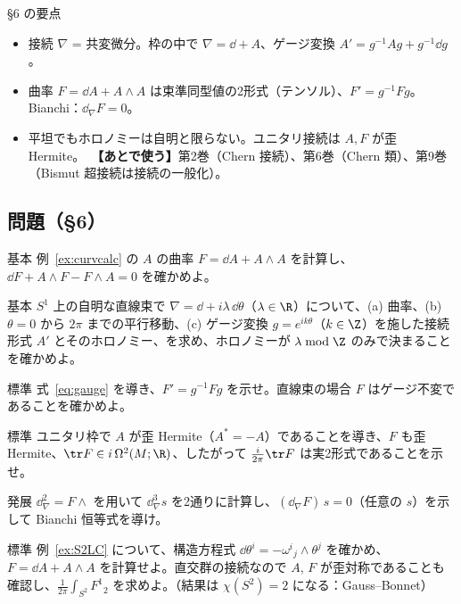 \begin{keybox}{§6 の要点}
\begin{itemize}
\item 接続 $\nabla$ = 共変微分。枠の中で $\nabla=\dd+A$、ゲージ変換 $A'=g^{-1}Ag+g^{-1}\dd g$。
\item 曲率 $F=\dd A+A\wedge A$ は束準同型値の2形式（テンソル）、$F'=g^{-1}Fg$。Bianchi：$\dd_\nabla F=0$。
\item 平坦でもホロノミーは自明と限らない。ユニタリ接続は $A,F$ が歪 Hermite。\ \textbf{【あとで使う】}第2巻（Chern 接続）、第6巻（Chern 類）、第9巻（Bismut 超接続は接続の一般化）。
\end{itemize}
\end{keybox}

\subsection*{問題（§6）}
\begin{prob}{基本}\label{p:curvcalc}
例~\ref{ex:curvcalc} の $A$ の曲率 $F=\dd A+A\wedge A$ を計算し、$\dd F+A\wedge F-F\wedge A=0$ を確かめよ。
\end{prob}
\begin{prob}{基本}\label{p:holonomy}
$S^1$ 上の自明な直線束で $\nabla=\dd+i\lambda\,\dd\theta$（$\lambda\in\R$）について、(a) 曲率、(b) $\theta=0$ から $2\pi$ までの平行移動、(c) ゲージ変換 $g=e^{ik\theta}$（$k\in\Z$）を施した接続形式 $A'$ とそのホロノミー、を求め、ホロノミーが $\lambda\bmod\Z$ のみで決まることを確かめよ。
\end{prob}
\begin{prob}{標準}\label{p:gauge}
式~\eqref{eq:gauge} を導き、$F'=g^{-1}Fg$ を示せ。直線束の場合 $F$ はゲージ不変であることを確かめよ。
\end{prob}
\begin{prob}{標準}\label{p:unitary}
ユニタリ枠で $A$ が歪 Hermite（$A^*=-A$）であることを導き、$F$ も歪 Hermite、$\tr F\in i\,\Omega^2(M;\R)$、したがって $\frac i{2\pi}\tr F$ は実2形式であることを示せ。
\end{prob}
\begin{prob}{発展}\label{p:bianchi}
$\dd_\nabla^2=F\wedge$ を用いて $\dd_\nabla^3s$ を2通りに計算し、$(\dd_\nabla F)\,s=0$（任意の $s$）を示して Bianchi 恒等式を導け。
\end{prob}
\begin{prob}{標準}\label{p:S2LC}
例~\ref{ex:S2LC} について、構造方程式 $\dd\theta^i=-\omega^i{}_j\wedge\theta^j$ を確かめ、$F=\dd A+A\wedge A$ を計算せよ。直交群の接続なので $A$, $F$ が歪対称であることも確認し、$\frac1{2\pi}\int_{S^2}F^1{}_2$ を求めよ。（結果は $\chi(S^2)=2$ になる：Gauss--Bonnet）
\end{prob}
